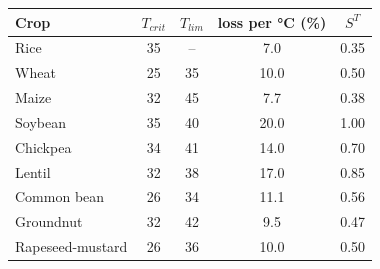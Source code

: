 \begin{tabular}{lcccc}
\toprule
Crop & $T_{crit}$ & $T_{lim}$ & loss per \si{\celsius} (\%) & $S^{T}$\\
\midrule
Rice & 35 & -- & 7.0 & 0.35 \\
Wheat & 25 & 35 & 10.0 & 0.50 \\
Maize & 32 & 45 & 7.7 & 0.38 \\
Soybean & 35 & 40 & 20.0 & 1.00 \\
Chickpea & 34 & 41 & 14.0 & 0.70 \\
Lentil & 32 & 38 & 17.0 & 0.85 \\
Common bean & 26 & 34 & 11.1 & 0.56 \\
Groundnut & 32 & 42 & 9.5 & 0.47 \\
Rapeseed-mustard & 26 & 36 & 10.0 & 0.50 \\
\bottomrule
\end{tabular}
